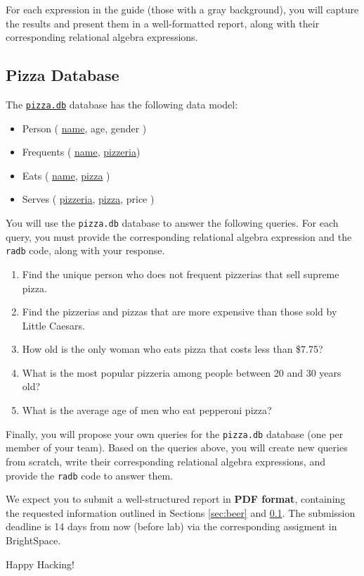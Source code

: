 \documentclass{article}
\begin{document}
\begin{tcolorbox}
For each expression in the guide (those with a gray background), you will capture the results and present them in a well-formatted report, along with their corresponding relational algebra expressions.
\end{tcolorbox}


\subsection{Pizza Database}\label{sec:pizza}
The \href{https://www.cs.ucr.edu/~acald013/public/Javeriana/DBS/pizza.db}{\texttt{pizza.db}} database has the following data model:

\begin{itemize}
  \item Person ( \underline{name}, age, gender )
  \item Frequents ( \underline{name}, \underline{pizzeria})
  \item Eats ( \underline{name}, \underline{pizza} )
  \item Serves ( \underline{pizzeria}, \underline{pizza}, price )
\end{itemize}

You will use the \texttt{pizza.db} database to answer the following queries. For each query, you must provide the corresponding relational algebra expression and the \texttt{radb} code, along with your response.

\begin{enumerate}
  \item Find the unique person who does not frequent pizzerias that sell supreme pizza.

  \item Find the pizzerias and pizzas that are more expensive than those sold by Little Caesars.

  \item How old is the only woman who eats pizza that costs less than \$7.75?

  \item What is the most popular pizzeria among people between 20 and 30 years old?

  \item What is the average age of men who eat pepperoni pizza?
\end{enumerate}

Finally, you will propose your own queries for the \texttt{pizza.db} database (one per member of your team). Based on the queries above, you will create new queries from scratch, write their corresponding relational algebra expressions, and provide the \texttt{radb} code to answer them.

We expect you to submit a well-structured report in \textbf{\large PDF format}, containing the requested information outlined in Sections \ref{sec:beer} and \ref{sec:pizza}. The submission deadline is 14 days from now (before lab) via the corresponding assigment in BrightSpace\texttrademark.

\vspace{5mm}
Happy Hacking! 
\end{document}
